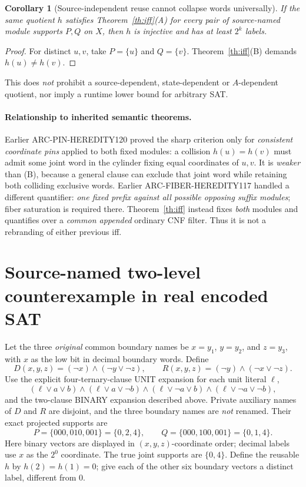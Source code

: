 \documentclass[11pt]{article}
\newtheorem{corollary}[theorem]{Corollary}
\begin{document}
\begin{corollary}[Source-independent reuse cannot collapse words universally]
If the \emph{same} quotient $h$ satisfies Theorem~\ref{th:iff}(A)
for every pair of source-named module supports $P,Q$ on $X$,
then $h$ is injective and has at least $2^k$ labels.
\end{corollary}
\begin{proof}
For distinct $u,v$, take $P=\{u\}$ and $Q=\{v\}$.
Theorem~\ref{th:iff}(B) demands $h(u)\ne h(v)$.
\end{proof}
This does \emph{not} prohibit a source-dependent, state-dependent or
$A$-dependent quotient, nor imply a runtime lower bound for arbitrary SAT.

\paragraph{Relationship to inherited semantic theorems.}
Earlier ARC-PIN-HEREDITY120 proved the sharp criterion only for
\emph{consistent coordinate pins} applied to both fixed modules:
a collision $h(u)=h(v)$ must admit some joint word in the
cylinder fixing equal coordinates of $u,v$. It is \emph{weaker}
than (B), because a general clause can exclude that joint word
while retaining both colliding exclusive words. Earlier
ARC-FIBER-HEREDITY117 handled a different quantifier:
\emph{one fixed prefix against all possible opposing suffix modules};
fiber saturation is required there. Theorem~\ref{th:iff}
instead fixes \emph{both} modules and quantifies over a
\emph{common appended} ordinary CNF filter. Thus it is not a
rebranding of either previous iff.

\section{Source-named two-level counterexample in real encoded SAT}
Let the three \emph{original} common boundary names be
$x=y_1$, $y=y_2$, and $z=y_3$, with $x$ as the low bit
in decimal boundary words. Define
\[
D(x,y,z)=(\neg x)\land(\neg y\lor\neg z),\qquad
R(x,y,z)=(\neg y)\land(\neg x\lor\neg z).
\]
Use the explicit four-ternary-clause UNIT expansion for each
unit literal $\ell$,
\[
(\ell\lor a\lor b)\land(\ell\lor a\lor\neg b)
\land(\ell\lor\neg a\lor b)\land(\ell\lor\neg a\lor\neg b),
\]
and the two-clause BINARY expansion described above.
Private auxiliary names of $D$ and $R$ are disjoint,
and the three boundary names are \emph{not} renamed.
Their exact projected supports are
\[
P=\{000,010,001\}=\{0,2,4\},\qquad
Q=\{000,100,001\}=\{0,1,4\}.
\]
Here binary vectors are displayed in $(x,y,z)$-coordinate order;
decimal labels use $x$ as the $2^0$ coordinate.
The true joint supports are $\{0,4\}$.
Define the reusable $h$ by $h(2)=h(1)=0$;
give each of the other six boundary vectors a distinct label,
different from $0$.
\end{document}
